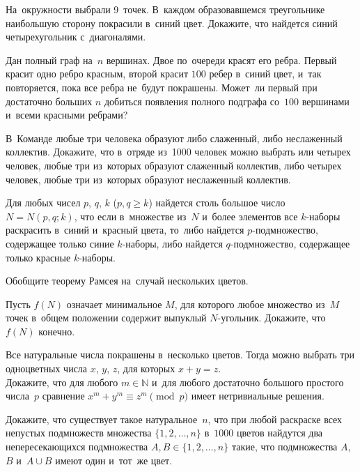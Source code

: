 


\begin{problems}

\item
На~окружности выбрали 9~точек.
В~каждом образовавшемся треугольнике наибольшую сторону покрасили в~синий цвет.
Докажите, что найдется синий четырехугольник с~диагоналями.

\item
Дан полный граф на~$n$ вершинах.
Двое по~очереди красят его ребра.
Первый красит одно ребро красным, второй красит $100$ ребер в~синий цвет, и~так
повторяется, пока все ребра не~будут покрашены.
Может~ли первый при достаточно больших $n$ добиться появления полного подграфа
со~$100$ вершинами и~всеми красными ребрами?

\item
В~Команде любые три человека образуют либо слаженный, либо
неслаженный коллектив.
Докажите, что в~отряде из~1000 человек можно выбрать или четырех человек, любые
три из~которых образуют слаженный коллектив, либо четырех человек, любые три
из~которых образуют неслаженный коллектив.

\item{}
Для любых чисел $p$, $q$, $k$ ($p, q \geq k$) найдется столь большое число
$N = N(p, q; k)$, что если в~множестве из~$N$ и~более элементов все $k$-наборы
раскрасить в~синий и~красный цвета, то~либо найдется $p$-подмножество,
содержащее только синие $k$-наборы, либо найдется $q$-подмножество, содержащее
только красные $k$-наборы.

\item
Обобщите теорему Рамсея на~случай нескольких цветов.

\item
Пусть $f(N)$ означает минимальное $M$, для которого любое множество
из~$M$ точек в~общем положении содержит выпуклый $N$-угольник.
Докажите, что $f(N)$ конечно.

\item
\subproblem{}
Все натуральные числа покрашены в~несколько цветов.
Тогда можно выбрать три одноцветных числа $x$, $y$, $z$, для которых
$x + y = z$.
\\
\subproblem
Докажите, что для любого $m \in \mathbb{N}$ и~для любого достаточно большого
простого числа~$p$ сравнение $x^{m} + y^{m} \equiv z^{m} \pmod{p}$ имеет
нетривиальные решения.

\item
Докажите, что существует такое натуральное~$n$, что при любой раскраске всех
непустых подмножеств множества $\{ 1, 2, \ldots, n \}$ в~$1000$ цветов найдутся
два непересекающихся подмножества $A, B \in \{1, 2, \ldots, n\}$ такие, что
подмножества $A$, $B$ и~$A \cup B$ имеют один и~тот~же цвет.

\end{problems}


